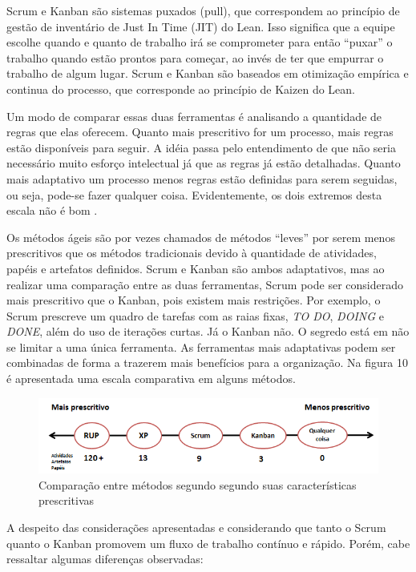 Scrum e Kanban são sistemas puxados (pull), que correspondem ao princípio de gestão de inventário de Just In Time (JIT) do Lean. Isso significa que a equipe escolhe quando e quanto de trabalho irá se comprometer para então “puxar” o trabalho quando estão prontos para começar, ao invés de ter que empurrar o trabalho de algum lugar. Scrum e Kanban são baseados em otimização empírica e continua do processo, que corresponde ao princípio de Kaizen do Lean.

Um modo de comparar essas duas ferramentas é analisando a quantidade de regras que elas oferecem. Quanto mais prescritivo for um processo, mais regras estão disponíveis para seguir. A idéia passa pelo entendimento de que não seria necessário muito esforço intelectual já que as regras já estão detalhadas. Quanto mais adaptativo um processo menos regras estão definidas para serem seguidas, ou seja, pode-se fazer qualquer coisa. Evidentemente, os dois extremos desta escala não é bom   \cite{kniberg2009}. 

Os métodos ágeis são por vezes chamados de métodos “leves” por serem menos prescritivos que os métodos tradicionais devido à quantidade de atividades, papéis e artefatos definidos. Scrum e Kanban são ambos adaptativos, mas ao realizar uma comparação entre as duas ferramentas, Scrum pode ser considerado mais prescritivo que o Kanban, pois existem mais restrições. Por exemplo, o Scrum prescreve um quadro de tarefas com as raias fixas, \textit{TO DO}, \textit{DOING} e \textit{DONE}, além do uso de iterações curtas. Já o Kanban não. O segredo está em não se limitar a uma única ferramenta. As ferramentas mais adaptativas podem ser combinadas de forma a trazerem mais benefícios para a organização. Na figura 10 é apresentada uma escala comparativa em alguns métodos.

\begin{figure}[H]
		\centering
		\label{fig02}
			\includegraphics[scale=0.7]{figuras/prescritivo.png}
		\caption{Comparação entre métodos segundo segundo suas características prescritivas \cite{kniberg2009}}
\end{figure}

A despeito das considerações apresentadas e considerando que tanto o Scrum quanto o Kanban promovem um fluxo de trabalho contínuo e rápido. Porém, cabe ressaltar algumas diferenças observadas:

